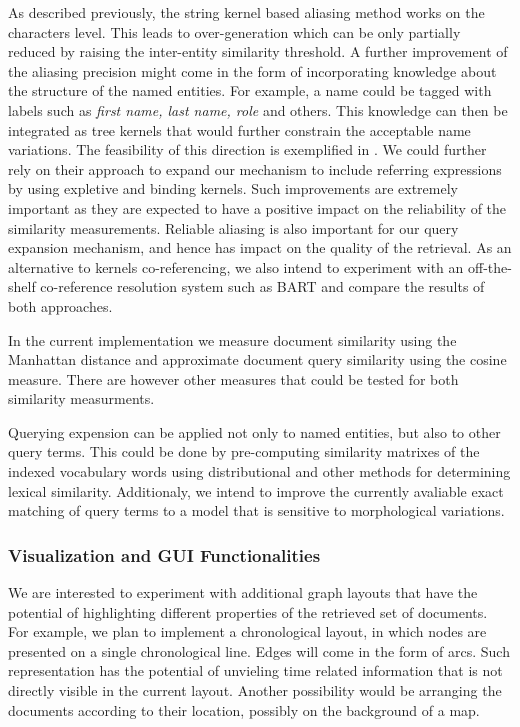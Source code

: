 As described previously, the string kernel based aliasing method works on the characters level. 
This leads to over-generation which can be only partially reduced by raising the inter-entity similarity threshold. 
A further improvement of the aliasing precision might come in the form of incorporating knowledge about the structure of the named entities. 
For example, a name could be tagged
with labels such as \emph{first name, last name, role} and others. This knowledge can then be integrated as tree kernels
that would further constrain the acceptable name variations. The feasibility of this direction is exemplified in \cite{string_kernel_coref}.
We could further rely on their approach to expand our mechanism to include referring expressions by using expletive and binding kernels.
Such improvements are extremely important as they are expected to have a positive impact on the reliability of the similarity measurements. 
Reliable aliasing is also important for our query expansion mechanism, and hence has impact on the quality of the retrieval.
As an alternative to kernels co-referencing, we also intend to experiment with an off-the-shelf co-reference resolution system such as 
BART and compare the results of both approaches. 

In the current implementation we measure document similarity using the Manhattan distance and approximate document query similarity 
using the cosine measure. There are however other measures that could be tested for both similarity measurments. 

Querying expension can be applied not only to named entities, but also to other query terms. This could be done by pre-computing similarity matrixes
of the indexed vocabulary words using distributional and other methods for determining lexical similarity. Additionaly, we intend to improve
the currently avaliable exact matching of query terms to a model that is sensitive to morphological variations.


\subsubsection{Visualization and GUI Functionalities}

We are interested to experiment with additional graph layouts that have the potential of highlighting different properties of the 
retrieved set of documents. For example, we plan to implement a chronological layout, in which nodes are presented on a single chronological 
line. Edges will come in the form of arcs. Such representation has the potential of unvieling time related information that is not 
directly visible in the current layout. Another possibility would be arranging the documents according to their location, possibly on the background
of a map. 

